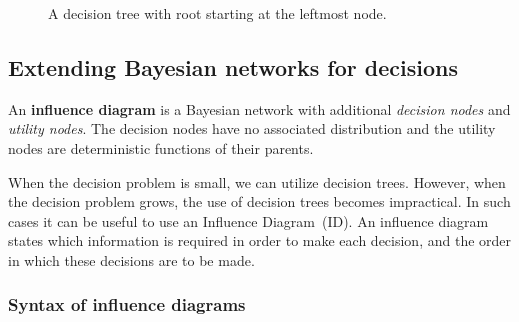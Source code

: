 \documentclass{article}
\begin{document}
\begin{figure}[H]
    \centering
    \caption{A decision tree with root starting at the leftmost node. }
    \label{fig:DT}
\end{figure}

\subsection{Extending Bayesian networks for decisions}

An \textbf{influence diagram} is a Bayesian network with additional \textit{decision nodes} and \textit{utility nodes}. The decision nodes have no associated distribution and the utility nodes are deterministic functions of their parents. 

When the decision problem is small, we can utilize decision trees. However, when the decision problem grows, the use of decision trees becomes impractical. In such cases it can be useful to use an Influence Diagram~(ID). An influence diagram states which information is required in order to make each decision, and the order in which these decisions are to be made. 

\subsubsection{Syntax of influence diagrams}
\end{document}
